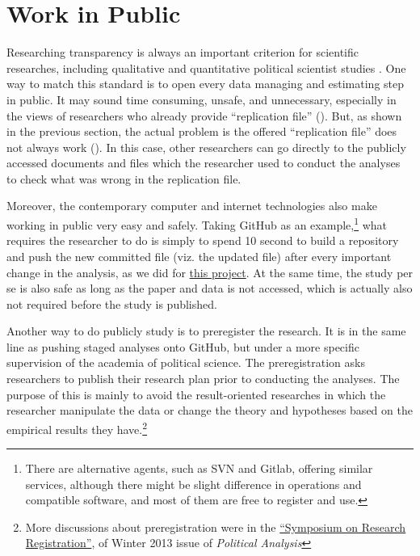 
\section{Work in Public}

Researching transparency is always an important criterion for scientific researches, including qualitative and quantitative political scientist studies \citep{Appadurai2000,Denzin2009}. One way to match this standard is to open every data managing and estimating step in public. It may sound time consuming, unsafe, and unnecessary, especially in the views of researchers who already provide ``replication file'' (\cite[e.g., ][]{Newman2015}). But, as shown in the previous section, the actual problem is the offered ``replication file'' does not always work (\cite[e.g., again, ][]{Newman2015}). In this case, other researchers can go directly to the publicly accessed documents and files which the researcher used to conduct the analyses to check what was wrong in the replication file. 

Moreover, the contemporary computer and internet technologies also make working in public very easy and safely. Taking GitHub as an example,\footnote{There are alternative agents, such as SVN and Gitlab, offering similar services, although there might be slight difference in operations and compatible software, and most of them are free to register and use.} what requires the researcher to do is simply to spend 10 second to build a repository and push the new committed file (viz. the updated file) after every important change in the analysis, as we did for \href{https://github.com/fsolt/meritocracy-rep}{this project}. At the same time, the study per se is also safe as long as the paper and data is not accessed, which is actually also not required before the study is published. 

Another way to do publicly study is to preregister the research. It is in the same line as pushing staged analyses onto GitHub, but under a more specific supervision of the academia of political science. The preregistration asks researchers to publish their research plan prior to conducting the analyses. The purpose of this is mainly to avoid the result-oriented researches in which the researcher manipulate the data or change the theory and hypotheses based on the empirical results they have.\footnote{More discussions about preregistration were in the \href{http://pan.oxfordjournals.org/content/21/1.toc}{``Symposium on Research Registration''}, of Winter 2013 issue of \textit{Political Analysis}}


